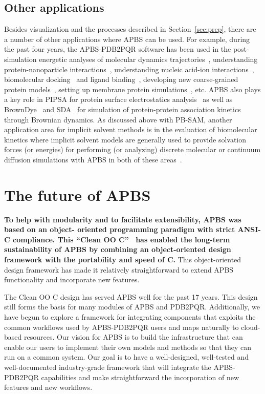 \documentclass[12pt,titlepage]{article}
\newcommand{\revision}[1]{\color{red} \textbf{#1} \leavevmode\color{black}}
\begin{document}
\subsection{Other applications}
Besides visualization and the processes described in Section~\ref{sec:prep}, there are a number of other applications where APBS can be used.
For example, during the past four years, the APBS-PDB2PQR software has been used in the post-simulation energetic analyses of molecular dynamics trajectories~\cite{Dror2013}, understanding protein-nanoparticle interactions~\cite{Treuel2013, DePaoli2014}, understanding nucleic acid-ion interactions~\cite{Lipfert2014}, biomolecular docking~\cite{Roberts2013} and ligand binding~\cite{Evangelidis2009}, developing new coarse-grained protein models~\cite{Spiga2013}, setting up membrane protein simulations~\cite{Stansfeld2015}, etc.
APBS also plays a key role in PIPSA for protein surface electrostatics analysis~\cite{Richter2008} as well as BrownDye~\cite{BrownDye} and SDA~\cite{Martinez2015} for simulation of protein-protein association kinetics through Brownian dynamics.
As discussed above with PB-SAM, another application area for implicit solvent methods is in the evaluation of biomolecular kinetics where implicit solvent models are generally used to provide solvation forces (or energies) for performing (or analyzing) discrete molecular or continuum diffusion simulations with APBS in both of these areas~\cite{Dror2013, Martinez2015, Cheng2007, Cheng2007a, Song2004a, Song2004a, Elcock2004, Mereghetti2012}.

\section{The future of APBS}
\revision{To help with modularity and to facilitate extensibility, APBS was based on an object- oriented programming paradigm with strict ANSI-C compliance.
This ``Clean OO C''~\cite{CleanOOC} has enabled the long-term sustainability of APBS by combining an object-oriented design framework with the portability and speed of C.}
This object-oriented design framework has made it relatively straightforward to extend APBS functionality and incorporate new features.

The Clean OO C design has served APBS well for the past 17 years.
This design still forms the basis for many modules of APBS and PDB2PQR.
Additionally, we have begun to explore a framework for integrating components that exploits the common workflows used by APBS-PDB2PQR users and maps naturally to cloud-based resources.
Our vision for APBS is to build the infrastructure that can enable our users to implement their own models and methods so that they can run on a common system.
Our goal is to have a well-designed, well-tested and well-documented industry-grade framework that will integrate the APBS-PDB2PQR capabilities and make straightforward the incorporation of new features and new workflows.
\end{document}
